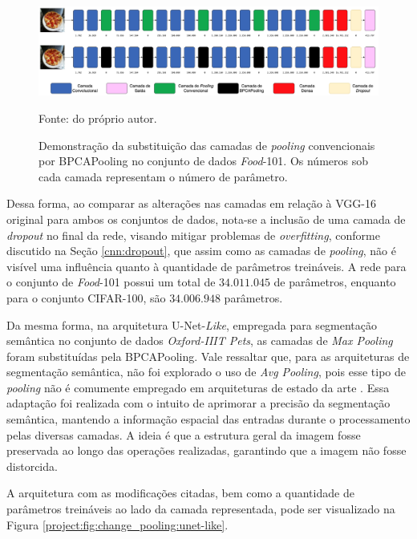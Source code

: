 \begin{figure}[H]
    \centering
    \caption{Demonstração da substituição das camadas de \textit{pooling} convencionais por BPCAPooling no conjunto de dados \textit{Food}-101. Os números sob cada camada representam o número de parâmetro.}
    \includegraphics[width=1\textwidth]{recursos/imagens/project/vgg-with-bpca-food.png}
    \label{project:fig:change_pooling:vgg-food}

    Fonte: do próprio autor.
\end{figure}

Dessa forma, ao comparar as alterações nas camadas em relação à VGG-16 original para ambos os conjuntos de dados, nota-se a inclusão de uma camada de \textit{dropout} no final da rede, visando mitigar problemas de \textit{overfitting}, conforme discutido na Seção \ref{cnn:dropout}, que assim como as camadas de \textit{pooling}, não é visível uma influência quanto à quantidade de parâmetros treináveis. A rede para o conjunto de \textit{Food}-101 possui um total de $34.011.045$ de parâmetros, enquanto para o conjunto CIFAR-100, são $34.006.948$ parâmetros.

Da mesma forma, na arquitetura U-Net-\textit{Like}, empregada para segmentação semântica no conjunto de dados \textit{Oxford-IIIT Pets}, as camadas de \textit{Max Pooling} foram substituídas pela BPCAPooling. Vale ressaltar que, para as arquiteturas de segmentação semântica, não foi explorado o uso de \textit{Avg Pooling}, pois esse tipo de \textit{pooling} não é comumente empregado em arquiteturas de estado da arte \citep{Ronneberger2015U-net:Segmentation,Kugelman2022ASegmentation}. Essa adaptação foi realizada com o intuito de aprimorar a precisão da segmentação semântica, mantendo a informação espacial das entradas durante o processamento pelas diversas camadas. A ideia é que a estrutura geral da imagem fosse preservada ao longo das operações realizadas, garantindo que a imagem não fosse distorcida.

A arquitetura com as modificações citadas, bem como a quantidade de parâmetros treináveis ao lado da camada representada, pode ser visualizado na Figura \ref{project:fig:change_pooling:unet-like}.

